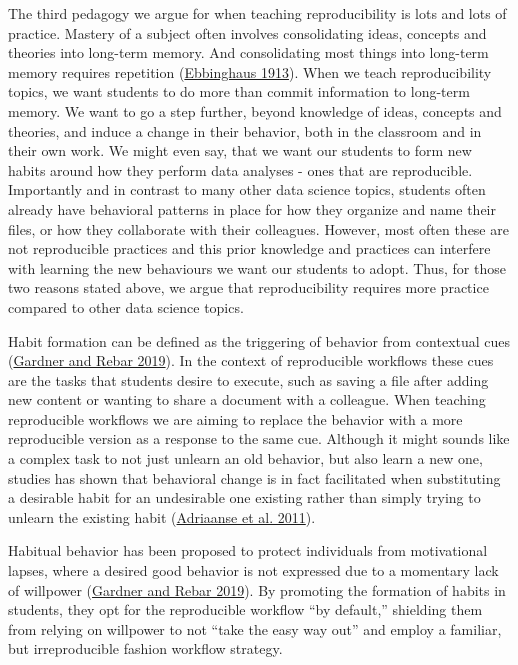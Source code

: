 \documentclass[
  12 pt,
]{paper}
\begin{document}
The third pedagogy we argue for when teaching reproducibility is lots
and lots of practice.
Mastery of a subject often involves consolidating ideas, concepts
and theories into long-term memory.
And consolidating most things into long-term memory
requires repetition (\protect\hyperlink{ref-ebbinghaus1913memory}{Ebbinghaus 1913}).
When we teach reproducibility topics,
we want students to do more than commit information to long-term memory.
We want to go a step further, beyond knowledge of ideas, concepts and theories,
and induce a change in their behavior,
both in the classroom and in their own work.
We might even say, that we want our students to form new
habits around how they perform data analyses - ones that are reproducible.
Importantly and in contrast to many other data science topics,
students often already have behavioral patterns in place for how they organize
and name their files, or how they collaborate with their colleagues.
However, most often these are not reproducible practices
and this prior knowledge
and practices can interfere with learning the new behaviours
we want our students to adopt.
Thus, for those two reasons stated above,
we argue that reproducibility requires more practice compared to other
data science topics.

Habit formation can be defined as the triggering of behavior from contextual cues (\protect\hyperlink{ref-rebar_gardner_2019}{Gardner and Rebar 2019}).
In the context of reproducible workflows these cues
are the tasks that students desire to execute,
such as saving a file after adding new content
or wanting to share a document with a colleague.
When teaching reproducible workflows
we are aiming to replace the behavior with a more reproducible version
as a response to the same cue.
Although it might sounds like a complex task to not just unlearn an old behavior,
but also learn a new one,
studies has shown that behavioral change is in fact facilitated
when substituting a desirable habit for an undesirable one existing
rather than simply trying to unlearn the existing habit
(\protect\hyperlink{ref-evers_adriaanse_2011}{Adriaanse et al. 2011}).

Habitual behavior has been proposed to protect individuals from motivational lapses,
where a desired good behavior is not expressed
due to a momentary lack of willpower (\protect\hyperlink{ref-rebar_gardner_2019}{Gardner and Rebar 2019}).
By promoting the formation of habits in students,
they opt for the reproducible workflow ``by default,''
shielding them from relying on willpower to not ``take the easy way out''
and employ a familiar, but irreproducible fashion workflow strategy.
\end{document}
